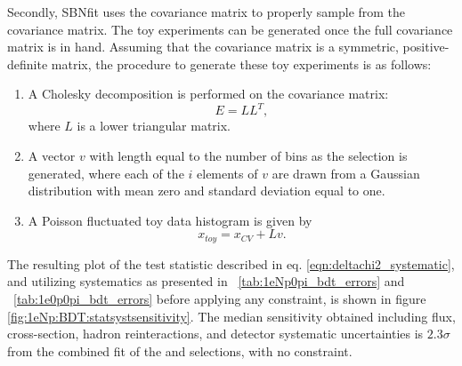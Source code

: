 Secondly, SBNfit uses the covariance matrix to properly sample from the covariance matrix.
The toy experiments can be generated once the full covariance matrix is in hand. Assuming that the covariance matrix is a symmetric, positive-definite matrix, the procedure to generate these toy experiments is as follows:
\begin{enumerate}
    \item A Cholesky decomposition \cite{bib:cholesky} is performed on the covariance matrix: $$E = LL^{T},$$
    where $L$ is a lower triangular matrix.
    \item A vector $v$ with length equal to the number of bins as the selection is generated, where each of the $i$ elements of $v$ are drawn from a Gaussian distribution with mean zero and standard deviation equal to one.
    \item A Poisson fluctuated toy data histogram is given by
$$x_{toy} = x_{CV} + Lv.$$
\end{enumerate}

The resulting plot of the test statistic described in eq. \ref{eqn:deltachi2_systematic}, and utilizing systematics as presented in ~\cref{tab:1eNp0pi_bdt_errors} and ~\cref{tab:1e0p0pi_bdt_errors} before applying any constraint, is shown in figure \ref{fig:1eNp:BDT:statsystsensitivity}. 
The median sensitivity obtained including flux, cross-section, hadron reinteractions, and detector systematic uncertainties is $2.3\sigma$ from the combined fit of the \npsel and \zpsel selections, with no \numu constraint.

